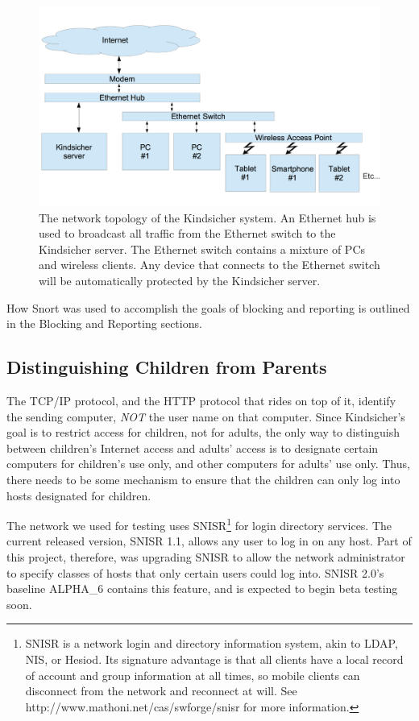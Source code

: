 \begin{figure}[!t]
    \centering
    \includegraphics[width=2\columnwidth]{figures/topology}
    \caption{The network topology of the Kindsicher system. An Ethernet hub is
        used to broadcast all traffic from the Ethernet switch to the
        Kindsicher server. The Ethernet switch contains a mixture of PCs and
        wireless clients. Any device that connects to the Ethernet switch will
        be automatically protected by the Kindsicher server.}
    \label{fig:topology}
\end{figure}

How Snort was used to accomplish the goals of blocking and reporting is outlined
in the Blocking and Reporting sections.

\subsection{Distinguishing Children from Parents}

The TCP/IP protocol, and the HTTP protocol that rides on top of it, identify
the sending computer, \emph{NOT} the user name on that computer.
%
Since Kindsicher's goal is to restrict access for children, not for adults,
the only way to distinguish between children's Internet access and adults'
access is to designate certain computers for children's use only, and other
computers for adults' use only.
%
Thus, there needs to be some mechanism to ensure that the children can only
log into hosts designated for children.

The network we used for testing uses SNISR\footnote{SNISR is a network login
and directory information system, akin to LDAP, NIS, or Hesiod.  Its
signature advantage is that all clients have a local record of account and
group information at all times, so mobile clients can disconnect from the
network and reconnect at will. See http://www.mathoni.net/cas/swforge/snisr
for more information.}
%
for login directory services.
%
The current released version, SNISR 1.1, allows any user to log in on any host.
%
Part of this project, therefore, was upgrading SNISR to allow the network
administrator to specify classes of hosts that only certain users could log
into.
%
SNISR 2.0's baseline ALPHA\_6 contains this feature, and is expected to begin
beta testing soon.


